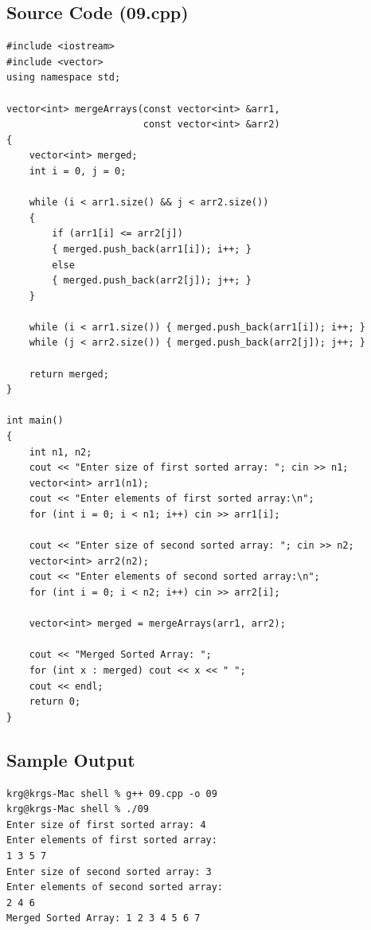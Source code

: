 \documentclass[a4paper,12pt]{article}
\begin{document}
\subsection*{Source Code (09.cpp)}
\begin{lstlisting}[style=cppstyle]
#include <iostream>
#include <vector>
using namespace std;

vector<int> mergeArrays(const vector<int> &arr1,
                        const vector<int> &arr2)
{
    vector<int> merged;
    int i = 0, j = 0;

    while (i < arr1.size() && j < arr2.size())
    {
        if (arr1[i] <= arr2[j])
        { merged.push_back(arr1[i]); i++; }
        else
        { merged.push_back(arr2[j]); j++; }
    }

    while (i < arr1.size()) { merged.push_back(arr1[i]); i++; }
    while (j < arr2.size()) { merged.push_back(arr2[j]); j++; }

    return merged;
}

int main()
{
    int n1, n2;
    cout << "Enter size of first sorted array: "; cin >> n1;
    vector<int> arr1(n1);
    cout << "Enter elements of first sorted array:\n";
    for (int i = 0; i < n1; i++) cin >> arr1[i];

    cout << "Enter size of second sorted array: "; cin >> n2;
    vector<int> arr2(n2);
    cout << "Enter elements of second sorted array:\n";
    for (int i = 0; i < n2; i++) cin >> arr2[i];

    vector<int> merged = mergeArrays(arr1, arr2);

    cout << "Merged Sorted Array: ";
    for (int x : merged) cout << x << " ";
    cout << endl;
    return 0;
}
\end{lstlisting}

\subsection*{Sample Output}
\begin{lstlisting}[style=outputstyle]
krg@krgs-Mac shell % g++ 09.cpp -o 09
krg@krgs-Mac shell % ./09
Enter size of first sorted array: 4
Enter elements of first sorted array:
1 3 5 7
Enter size of second sorted array: 3
Enter elements of second sorted array:
2 4 6
Merged Sorted Array: 1 2 3 4 5 6 7
\end{lstlisting}

\newpage

\end{document}
